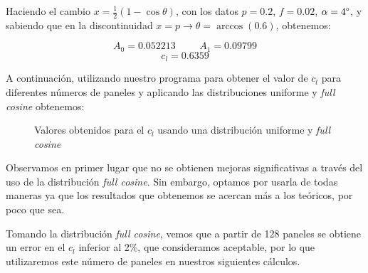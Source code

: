 \documentclass[10pt, a4paper]{article}
\begin{document}
Haciendo el cambio $x = \frac{1}{2}(1-\cos\theta)$, con los datos $p=0.2$, $f=0.02$, $\alpha=4\degree$, y sabiendo que en la discontinuidad $x=p\rightarrow\theta=\arccos(0.6)$, obtenemos:

\[A_0=0.052213 \hspace{1cm} A_1=0.09799\]
\[c_l = 0.6359\]

A continuación, utilizando nuestro programa para obtener el valor de $c_l$ para diferentes números de paneles y aplicando las distribuciones uniforme y \textit{full cosine} obtenemos:

\begin{figure}[H]
  \begin{center}
  \end{center}
  \caption{Valores obtenidos para el $c_l$ usando una distribución uniforme y \textit{full cosine}}
\end{figure}

Observamos en primer lugar que no se obtienen mejoras significativas a través del uso de la distribución \textit{full cosine}. Sin embargo, optamos por usarla de todas maneras ya que los resultados que obtenemos se acercan más a los teóricos, por poco que sea.

Tomando la distribución \textit{full cosine}, vemos que a partir de 128 paneles se obtiene un error en el $c_l$ inferior al 2\%, que consideramos aceptable, por lo que utilizaremos este número de paneles en nuestros siguientes cálculos.
\end{document}
